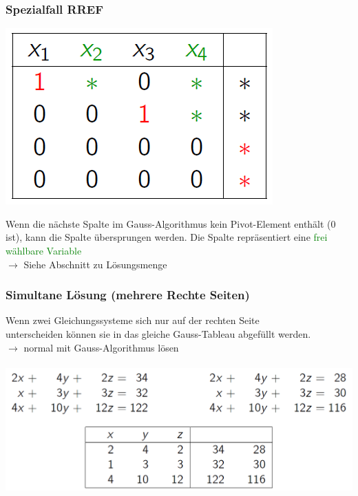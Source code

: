 		    
		    
			\subsubsection{Spezialfall RREF}
	
			\begin{minipage}[b]{.5\linewidth} 
  			\includegraphics[width=\linewidth]{Bilder/RREF-Tableau}
			\end{minipage}
			\hfill
			\begin{minipage}[b]{.45\linewidth} 
  			Wenn die nächste Spalte im Gauss-Algorithmus kein Pivot-Element enthält (0 ist), kann die Spalte 						übersprungen werden. Die Spalte repräsentiert eine 					\textcolor{green}{frei wählbare Variable} \\
			$\rightarrow$ Siehe Abschnitt zu Lösungsmenge\\	
			\end{minipage}			
   		
   			
   			
   			
   		
   		
   		
   		
		    \subsubsection{Simultane Lösung (mehrere Rechte Seiten)}
		    Wenn zwei Gleichungssysteme sich nur auf der rechten Seite \\
		    unterscheiden können sie in das gleiche Gauss-Tableau abgefüllt werden.\\
		    $\rightarrow$ normal mit Gauss-Algorithmus lösen \\
		    \\
		    \includegraphics[width=0.6\linewidth]{Bilder/mehrere_rechte_seiten}
		    
